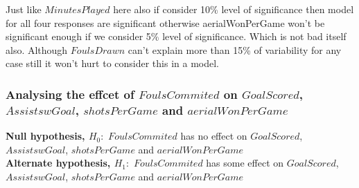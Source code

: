 \documentclass[12pt]{article}
\begin{document}
Just like $ MinutesPlayed $ here also if consider  10\% level of significance then model for all four responses are significant otherwise aerialWonPerGame won't be significant enough if we consider 5\% level of significance. Which is not bad itself also. Although $ FoulsDrawn $ can't explain more than 15\% of variability for any case still it won't hurt to consider this in a model.

\newpage

\subsubsection{Analysing the effcet of $ FoulsCommited $ on $ GoalScored $, \\ $ AssistswGoal $, $ shotsPerGame $ and $ aerialWonPerGame $}

\textbf{Null hypothesis, $ H_0: $} $ FoulsCommited $ has no effect on $ GoalScored $, $ AssistswGoal $, $ shotsPerGame $ and $ aerialWonPerGame $\\
\textbf{Alternate hypothesis, $ H_1: $} $ FoulsCommited $ has some effect on $ GoalScored $, $ AssistswGoal $, $ shotsPerGame $ and $ aerialWonPerGame $
\end{document}
